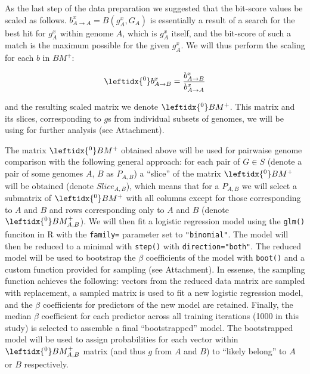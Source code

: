 As the last step of the data preparation we suggested that the bit-score values be
scaled as follows. $b_{A \rightarrow A}^x = B(g_A^x, G_A)$ is essentially a
result of a search for the best hit for $g_A^x$ within genome $A$, which is
$g_A^x$ itself, and the bit-score of such a match is the maximum possible for
the given $g_A^x$. We will thus perform the scaling for each $b$ in $BM^+$:

\begin{equation}
\leftidx{^0}b_{A \rightarrow B}^x = \dfrac{b_{A \rightarrow B}^x}{b_{A \rightarrow
A}^x}
\end{equation}

\newcommand{\bmzp}{\leftidx{^0}BM^+}

and the resulting scaled matrix we denote $\leftidx{^0}BM^+$. This matrix and
its slices, corresponding to $g$s from individual subsets of genomes, we will
be using for further analysis (see Attachment).

The matrix $\bmzp{}$ obtained above will be used for pairwaise genome
comparison with the following general approach:
for each pair of $G \in S$ (denote a pair of some genomes $A$, $B$ as
$P_{A,B}$) a ``slice'' of the matrix $\bmzp{}$
will be obtained (denote $Slice_{A,B}$), which means that for a $P_{A,B}$ we
will select a submatrix of $\bmzp{}$ with all columns except for those
corresponding to $A$ and $B$ and rows corresponding only to $A$ and $B$ (denote
$\leftidx{^0}BM_{A,B}^+$).
\newcommand{\bmzpab}{\leftidx{^0}BM_{A,B}^+}
We will then fit a logistic regression model using the {\tt glm{()}} funciton
in R with the {\tt family=} parameter set to {\tt "binomial"}. The model will
then be reduced to a minimal with {\tt step()} with {\tt direction="both"}. The
reduced model will be used to bootstrap the $\beta$ coefficients of the model
with {\tt boot()} and a custom function provided for sampling (see Attachment).
In essense, the sampling function achieves the following: vectors from the
reduced data matrix are sampled with replacement, a sampled matrix is used to
fit a new logistic regression model, and the $\beta$ coefficients for
predictors of the new model are retained. Finally, the median $\beta$
coefficient for each predictor across all training iterations (1000 in this
study) is selected to assemble a final ``bootstrapped''
model. The bootstrapped model will be used to assign probabilities for each
vector within $\bmzpab$ matrix (and thus $g$ from $A$ and $B$) to ``likely
belong'' to $A$ or $B$ respectively.

